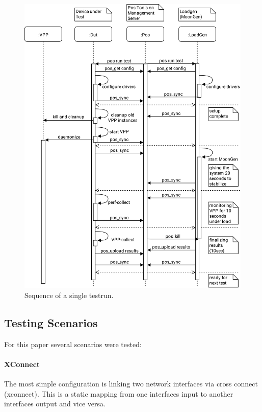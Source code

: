 \begin{figure}[!ht]
\noindent\hspace{0.5mm}\includegraphics[width=\linewidth]{pics/procedure-sequence.png}
\caption{Sequence of a single testrun. }
\label{testsequence}
\end{figure}


\subsection{Testing Scenarios}

For this paper several scenarios were tested: 

\paragraph{XConnect} 

The most simple configuration is linking two network interfaces via cross connect (xconnect). This is a static mapping from one interfaces input to another interfaces output and vice versa. 

